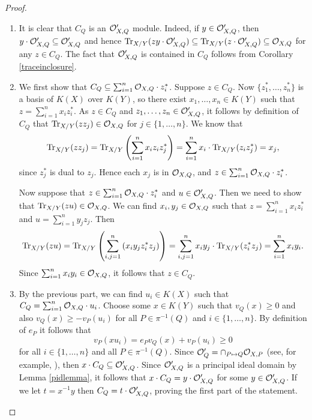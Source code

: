     \begin{proof}
        \begin{enumerate}
        \item It is clear that $C_Q$ is an ${\cal O}_{X,Q}'$ module.
        Indeed, if $y\in {\cal O}_{X,Q}'$, then $y\cdot {\cal O}_{X,Q}' \subseteq {\cal O}_{X,Q}'$ and hence $\operatorname{Tr}_{X/Y}(z y\cdot {\cal O}_{X,Q}')\subseteq \operatorname{Tr}_{X/Y}(z\cdot {\cal O}_{X,Q}') \subseteq {\cal O}_{X,Q}$ for any $z\in C_Q$.
        The fact that ${\cal O}_{X,Q}'$ is contained in $C_Q$ follows from Corollary \ref{traceinclosure}.
        \item We first show that $C_Q \subseteq \sum_{i=1}^n {\cal O}_{X,Q}\cdot z_i^*$.
        Suppose $z\in C_Q$.
        Now $\{z_1^*, \ldots ,z_n^*\}$ is a basis of $K(X)$ over $K(Y)$, so there exist $x_1,\ldots , x_n\in K(Y)$ such that $z=\sum_{i=1}^n x_iz_i^*$.
        As $z\in C_Q$ and $z_1,\ldots ,z_n\in {\cal O}_{X,Q}'$, it follows by definition of $C_Q$ that $\operatorname{Tr}_{X/Y}(zz_j)\in {\cal O}_{X,Q}$ for $j\in \{1,\ldots ,n\}$.
        We know that 
            \[
            \operatorname{Tr}_{X/Y}(zz_j) = \operatorname{Tr}_{X/Y}\left(\sum_{i=1}^nx_iz_iz_j^*\right) = \sum_{i=1}^nx_i \cdot \operatorname{Tr}_{X/Y}(z_iz_j^*) = x_j,
            \]
        since $z_j^*$ is dual to $z_j$.
        Hence each $x_j$ is in ${\cal O}_{X,Q}$, and $z\in \sum_{i=1}^n{\cal O}_{X,Q}\cdot z_i^*$.
        
        Now suppose that $z\in \sum_{i=1}^n{\cal O}_{X,Q}\cdot z_i^*$ and $u\in {\cal O}_{X,Q}'$.
        Then we need to show that $\operatorname{Tr}_{X/Y}(z u)\in {\cal O}_{X,Q}$.
        We can find $x_i, y_j\in {\cal O}_{X,Q}$ such that $z=\sum_{i=1}^n x_iz_i^*$ and $u=\sum_{i=1}^ny_jz_j$.
        Then
            \[
            \operatorname{Tr}_{X/Y}(zu) = \operatorname{Tr}_{X/Y}\left(\sum_{i,j=1}^n \left(x_iy_jz_i^*z_j\right)\right) = \sum_{i,j=1}^n x_iy_j\cdot \operatorname{Tr}_{X/Y}(z_i^*z_j) = \sum_{i=1}^n x_iy_i.
            \]
        Since $\sum_{i=1}^n x_iy_i\in {\cal O}_{X,Q}$, it follows that $z\in C_Q$.
        \item By the previous part, we can find $u_i\in K(X)$ such that $C_Q = \sum_{i=1}^n {\cal O}_{X,Q} \cdot u_i$.
        Choose some $x\in K(Y)$ such that $v_Q(x)\geq 0$ and also $v_Q(x)\geq -v_P(u_i)$ for all $P\in \pi^{-1}(Q)$ and $i\in \{1,\ldots ,n\}$.
        By definition of $e_P$ it follows that
            \[ 
            v_P(xu_i) = e_Pv_Q(x) + v_P(u_i) \geq 0
            \]
        for all $i\in \{1,\ldots, n\}$ and all $P\in \pi^{-1}(Q)$.
        Since ${\cal O}'_Q = \cap_{P\mapsto Q} {\cal O}_{X,P}$ (see, for example, \cite[Cor. 3.3.5]{stichtenoth}), then $x\cdot C_Q \subseteq {\cal O}_{X,Q}'$.
        Since ${\cal O}_{X,Q}'$ is a principal ideal domain by Lemma \ref{pidlemma}, it follows that $x\cdot C_Q = y\cdot {\cal O}_{X,Q}'$ for some $y\in {\cal O}_{X,Q}'$.
        If we let $t=x^{-1}y$ then $C_Q =t\cdot {\cal O}_{X,Q}'$, proving the first part of the statement.
        

\end{enumerate}
\end{proof}
